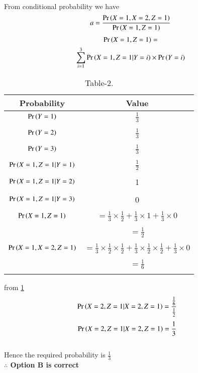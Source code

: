 \\From conditional probability we have
\begin{align}
    a=\frac{\Pr\left(X=1,X=2,Z=1\right)}{\Pr\left(X=1,Z=1\right)}
\end{align}
\begin{multline}
    \Pr\left(X=1,Z=1\right)=\\
    \sum_{i=1}^{3}\Pr\left(X=1,Z=1|Y=i\right)
    \times \Pr\left(Y=i\right)
\end{multline}
\newpage
\begin{table}[h!]
\resizebox{\columnwidth}{!}
{
    \begin{tabular}{|c|c|}
         \hline
         Probability & Value\\
         \hline
         $\Pr\left(Y=1\right)$ & $\frac{1}{3}$\\&\\
         \hline
         $\Pr\left(Y=2\right)$ & $\frac{1}{3}$\\&\\
         \hline
         $\Pr\left(Y=3\right)$ & $\frac{1}{3}$\\&\\
         \hline
         $\Pr\left(X=1,Z=1|Y=1\right)$ & $\frac{1}{2}$ \\&\\
         \hline
         $\Pr\left(X=1,Z=1|Y=2\right)$ & 1\\&\\
         \hline
         $\Pr\left(X=1,Z=1|Y=3\right)$  & 0 \\&\\
         \hline
         $\Pr\left(X=1,Z=1\right)$ & $=\frac{1}{3}\times \frac{1}{2}+\frac{1}{3}\times 1+\frac{1}{3} \times 0$\\&\\ &$=\frac{1}{2}$\\&\\
         \hline
         $\Pr\left(X=1,X=2,Z=1\right)$ & $=\frac{1}{3}\times \frac{1}{2}\times \frac{1}{2}+\frac{1}{3}\times \frac{1}{2}\times \frac{1}{2}+\frac{1}{3}\times 0$\\&\\&$=\frac{1}{6}$\\&\\
         \hline
    \end{tabular}
    }
    \caption{\label{ec2021-7:tab:Table-2}Table-2.}
\end{table}
from \ref{ec2021-7:tab:Table-2} 
\begin{align}
\Pr\left(X=2,Z=1|X=2,Z=1\right)&=\frac{\frac{1}{6}}{\frac{1}{2}}
\end{align}
\begin{align}
\Pr\left(X=2,Z=1|X=2,Z=1\right)&=\frac{1}{3}
\end{align}
\\Hence the required probability is $\frac{1}{3}$
 \\ \textbf{$\therefore$ Option B is correct}
